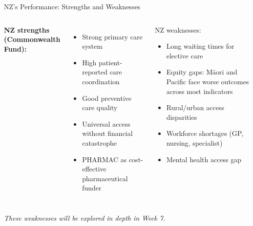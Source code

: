 \documentclass[aspectratio=169, 12pt]{beamer}
\begin{document}
\begin{frame}{NZ's Performance: Strengths and Weaknesses}
  \begin{columns}
      \small\textbf{NZ strengths (Commonwealth Fund):}
      \begin{itemize}\small
        \item Strong primary care system
        \item High patient-reported care coordination
        \item Good preventive care quality
        \item Universal access without financial catastrophe
        \item PHARMAC as cost-effective pharmaceutical funder
      \end{itemize}
      \begin{alertblock}{NZ weaknesses:}
        \small
        \begin{itemize}
          \item Long waiting times for elective care
          \item Equity gaps: M\=aori and Pacific face worse outcomes across most indicators
          \item Rural/urban access disparities
          \item Workforce shortages (GP, nursing, specialist)
          \item Mental health access gap
        \end{itemize}
      \end{alertblock}
  \end{columns}
  \small\textit{These weaknesses will be explored in depth in Week 7.}
\end{frame}
\end{document}
